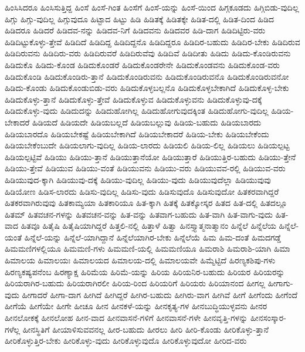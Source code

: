 {ಹಿಂಸಿಸಿದರೂ
ಹಿಂಸಿಸುತ್ತಿದ್ದ
ಹಿಂಸೆ
ಹಿಂಸೆ-ಗಿಂತ
ಹಿಂಸೆಗೆ
ಹಿಂಸೆ-ಯನ್ನು
ಹಿಂಸೆ-ಯಿಂದ
ಹಿಗ್ಗಕೂಡದು
ಹಿಗ್ಗಿಬಿಡು-ವುದಿಲ್ಲ
ಹಿಗ್ಗು
ಹಿಗ್ಗು-ವುದಿಲ್ಲ
ಹಿಗ್ಗುವುದೂ
ಹಿಟ್ಟಾದ
ಹಿಟ್ಟು
ಹಿಡಿ
ಹಿಡಿತಕ್ಕೆ
ಹಿಡಿತಕ್ಕೇ
ಹಿಡಿತ-ದಲ್ಲಿ
ಹಿಡಿತ-ದಿಂದ
ಹಿಡಿದ
ಹಿಡಿದರೂ
ಹಿಡಿದರೆ
ಹಿಡಿದವ-ನನ್ನು
ಹಿಡಿದವ-ನಿಗೆ
ಹಿಡಿದವನು
ಹಿಡಿದವರ
ಹಿಡಿ-ದಾಗ
ಹಿಡಿದಿಟ್ಟಿರು-ವರು
ಹಿಡಿದಿಟ್ಟುಕೊಳ್ಳು-ತ್ತೇವೆ
ಹಿಡಿದಿದೆ
ಹಿಡಿದಿದ್ದ
ಹಿಡಿದಿದ್ದನೊ
ಹಿಡಿದಿದ್ದರೂ
ಹಿಡಿದಿರ-ಬಹುದು
ಹಿಡಿದಿರ-ಬೇಕು
ಹಿಡಿದಿರುವ
ಹಿಡಿದಿರುವನು
ಹಿಡಿದಿರು-ವರು
ಹಿಡಿದಿರುವರೆ
ಹಿಡಿದಿರುವೆವು
ಹಿಡಿದಿವೆ
ಹಿಡಿದೀತು
ಹಿಡಿದು
ಹಿಡಿದು-ಕೊಂಡಿರುವನು
ಹಿಡಿದುಕೊ
ಹಿಡಿದು-ಕೊಂಡ
ಹಿಡಿದುಕೊಂಡರೆ
ಹಿಡಿದುಕೊಂಡರೇನೇ
ಹಿಡಿದುಕೊಂಡವನು
ಹಿಡಿದುಕೊಂಡ-ವರು
ಹಿಡಿದುಕೊಂಡಿ
ಹಿಡಿದುಕೊಂಡಿರು-ತ್ತಾನೆ
ಹಿಡಿದುಕೊಂಡಿರುವನು
ಹಿಡಿದುಕೊಂಡಿರುವನೊ
ಹಿಡಿದುಕೊಂಡಿರುವನೋ
ಹಿಡಿದು-ಕೊಂಡು
ಹಿಡಿದುಕೊಂಡುಬಿಡು-ವರು
ಹಿಡಿದುಕೊಳ್ಳಬಲ್ಲನೊ
ಹಿಡಿದುಕೊಳ್ಳಬೇಕಾಗಿದೆ
ಹಿಡಿದುಕೊಳ್ಳ-ಬೇಕು
ಹಿಡಿದುಕೊಳ್ಳು-ತ್ತಾನೆ
ಹಿಡಿದುಕೊಳ್ಳು-ತ್ತೇವೆ
ಹಿಡಿದುಕೊಳ್ಳುವ
ಹಿಡಿದುಕೊಳ್ಳುವನು
ಹಿಡಿದುಕೊಳ್ಳುವು-ದಕ್ಕೆ
ಹಿಡಿದುಕೊಳ್ಳು-ವುದು
ಹಿಡಿದುದನ್ನು
ಹಿಡಿದುಹೋಗಿಲ್ಲ
ಹಿಡಿದುಹೋಗುವುದಕ್ಕಿಂತ
ಹಿಡಿದುಹೋಗು-ವುದಿಲ್ಲ
ಹಿಡಿಯ-ಬೇಕಾದರೆ
ಹಿಡಿಯದೆ
ಹಿಡಿಯದೇ
ಹಿಡಿಯಬಲ್ಲದೆ
ಹಿಡಿಯಬಲ್ಲುವು
ಹಿಡಿಯ-ಬಹುದು
ಹಿಡಿಯಬಾರದು
ಹಿಡಿಯಬಾರದೊ
ಹಿಡಿಯಬೇಕಷ್ಟೆ
ಹಿಡಿಯಬೇಕಾಗಿದೆ
ಹಿಡಿಯಬೇಕಾದರೆ
ಹಿಡಿಯ-ಬೇಕು
ಹಿಡಿಯಬೇಕೆಂದು
ಹಿಡಿಯಬೇಕೆಂಬುದೇ
ಹಿಡಿಯಲಾಗು-ವುದಿಲ್ಲ
ಹಿಡಿಯ-ಲಾರದು
ಹಿಡಿಯಲಿ
ಹಿಡಿಯ-ಲಿಲ್ಲ
ಹಿಡಿಯಲು
ಹಿಡಿಯಲ್ಪಟ್ಟ
ಹಿಡಿಯಲ್ಪಟ್ಟಿವೆ
ಹಿಡಿಯು
ಹಿಡಿಯು-ತ್ತಾನೆ
ಹಿಡಿಯುತ್ತಾನೆಯೋ
ಹಿಡಿಯುತ್ತಾರೆ
ಹಿಡಿಯುತ್ತಿರ-ಬಹುದು
ಹಿಡಿಯು-ತ್ತೇನೆ
ಹಿಡಿಯು-ತ್ತೇವೆ
ಹಿಡಿಯುವ
ಹಿಡಿಯು-ವಂತೆ
ಹಿಡಿಯುವನು
ಹಿಡಿಯು-ವರು
ಹಿಡಿಯುವವ-ರಲ್ಲಿ
ಹಿಡಿಯುವ-ವರು
ಹಿಡಿಯುವುದ-ಕ್ಕಾಗಿ
ಹಿಡಿಯುವು-ದಕ್ಕೆ
ಹಿಡಿಯು-ವುದಿಲ್ಲ
ಹಿಡಿಯು-ವುದು
ಹಿಡಿಯುವುದೆಲ್ಲಾ
ಹಿಡಿಯುವುವು
ಹಿಡಿಯೋಣ
ಹಿಡಿಸ-ಲಾರದು
ಹಿಡಿಸು-ವುದಿಲ್ಲ
ಹಿಡಿಸು-ವುದು
ಹಿಡಿಸುವುದೊ
ಹಿಡಿಸುವುದೋ
ಹಿತಕರವಾಗಿದ್ದರೆ
ಹಿತಕರವಾಗಿರುವುವು
ಹಿತಕಾಮ್ಯಯಾ
ಹಿತಕಾರಿಯೂ
ಹಿತ-ಕ್ಕಾಗಿ
ಹಿತಕ್ಕೆ
ಹಿತಕ್ಕೋಸ್ಕರ
ಹಿತದ
ಹಿತ-ದಲ್ಲಿ
ಹಿತದಲ್ಲೂ
ಹಿತಮ್
ಹಿತವಚನ-ಗಳನ್ನು
ಹಿತವಚನ-ವನ್ನು
ಹಿತ-ವನ್ನು
ಹಿತವಾಗ-ಬಹುದು
ಹಿತ-ವಾಗಿ
ಹಿತ-ವಾಗು-ವುದು
ಹಿತ-ವಾದ
ಹಿತವೂ
ಹಿತೈಷಿ
ಹಿತೈಷಿಯಾಗಿದ್ದರೆ
ಹಿತ್ತಲಿ-ನಲ್ಲಿ
ಹಿತ್ತಾಳೆ
ಹಿತ್ವಾ
ಹಿನಸ್ತ್ಯಾತ್ಮನಾತ್ಮಾನಂ
ಹಿನ್ನೆಲೆ
ಹಿನ್ನೆಲೆಯ
ಹಿನ್ನೆಲೆ-ಯಂತೆ
ಹಿನ್ನೆಲೆ-ಯನ್ನು
ಹಿನ್ನೆಲೆ-ಯಾಗಿದ್ದಾನೆ
ಹಿನ್ನೆಲೆಯಾಗಿರ-ಬೇಕು
ಹಿನ್ನೆಲೆಯೆ
ಹಿಮ
ಹಿಮ-ದಂತೆ
ಹಿಮದಗಡ್ಡೆ
ಹಿಮಮಣಿಗಳಲ್ಲಿಯೂ
ಹಿಮಮಣಿ-ಗಳು
ಹಿಮಮಣಿ-ಯಲ್ಲಿ
ಹಿಮಮಣಿಯೂ
ಹಿಮರಾಶಿ
ಹಿಮರಾಶಿ-ಯಾಗಿ
ಹಿಮಾ
ಹಿಮಾಲಯ
ಹಿಮಾಲಯಃ
ಹಿಮಾಲಯದ
ಹಿಮಾಲಯ-ದಲ್ಲಿ
ಹಿಮಾಲಯವೇ
ಹಿಮ್ಮೆಟ್ಟಿದೆ
ಹಿರಣ್ಯಕಶಿಪು-ಗಳು
ಹಿರಣ್ಯಕಷ್ಯಪನೆಂಬ
ಹಿರಣ್ಯಾಕ್ಷ
ಹಿರಿಮೆಯ
ಹಿರಿಮೆ-ಯನ್ನು
ಹಿರಿಯ
ಹಿರಿಯನಿರ-ಬಹುದು
ಹಿರಿಯರ
ಹಿರಿಯರನ್ನು
ಹಿರಿಯರಾಗಿರ-ಬಹುದು
ಹಿರಿಯರಾಗಿರಲೀ
ಹಿರಿಯ-ರಿಂದ
ಹಿರಿಯರಿಗೆ
ಹಿರಿಯರು
ಹಿರಿಯಾನಂದ
ಹೀಗಲ್ಲ
ಹೀಗಾಗು-ವುದು
ಹೀಗಾದರೆ
ಹೀಗಾ-ದಾಗ
ಹೀಗಿದೆ
ಹೀಗಿದ್ದರೆ
ಹೀಗಿರ-ಬಹುದು
ಹೀಗಿರು-ವಾಗ
ಹೀಗಿವೆ
ಹೀಗೆ
ಹೀಗೆಂದು
ಹೀಗೆಂದೆ
ಹೀಗೆಯೆ
ಹೀಗೆಯೇ
ಹೀಗೇ
ಹೀಚೂ
ಹೀನ
ಹೀನಕಳೆ-ಯನ್ನು
ಹೀನಕೃತ್ಯ-ಗಳ
ಹೀನಬುದ್ಧಿಯುಳ್ಳವನು
ಹೀನರ
ಹೀನಲೋಕಕ್ಕೆ
ಹೀನಲೋಹ
ಹೀನ-ವಾದ
ಹೀನವಾಸನೆ-ಗಳಿಗೆ
ಹೀನವಾಸನೆ-ಗಳೇ
ಹೀನವೃತ್ತಿ-ಗಳನ್ನು
ಹೀನಸಂಸ್ಕಾರ-ಗಳೆಲ್ಲ
ಹೀನಸ್ಥಿತಿಗೆ
ಹೀಯಾಳಿಸುವವನಲ್ಲ
ಹೀರ-ಬಹುದು
ಹೀರಲು
ಹೀರಿ
ಹೀರಿ-ಕೊಂಡು
ಹೀರಿಕೊಳ್ಳು-ತ್ತಾನೆ
ಹೀರಿಕೊಳ್ಳುತ್ತಿರ-ಬೇಕು
ಹೀರಿಕೊಳ್ಳು-ವುದು
ಹೀರಿಕೊಳ್ಳುವುದೊ
ಹೀರಿಕೊಳ್ಳುವುದೋ
ಹೀರಿದ-ವರು
}
